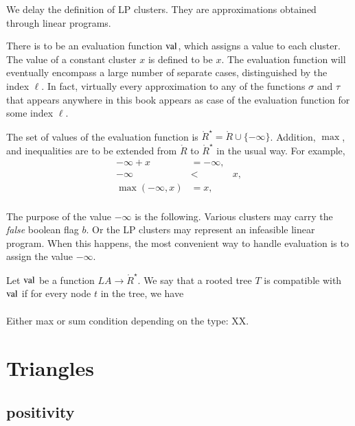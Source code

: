 We delay the definition of LP clusters.  They are approximations
obtained through linear programs.



There is to be an evaluation function ${\operatorname{val}}$, which assigns a value
to each cluster.  The value of a constant cluster $x$ is defined to be $x$.
The evaluation function will eventually encompass a large number of
separate cases, distinguished by the index $\ell$.  
In fact, virtually every approximation
to any of the functions $\sigma$ and $\tau$ that appears anywhere
in this book appears as case of the evaluation function for some index
$\ell$.

The set of values of the evaluation function is 
$\ring{R}^\star = \ring{R}\cup\{-\infty\}$.
Addition, $\max$, and inequalities are to be extended from
$\ring{R}$ to $\ring{R}^\star$ in the usual way.  For example,
  $$
  \begin{array}{lll}
    -\infty + x &= -\infty,\\
    -\infty &< & x,\\
    \max(-\infty,x) &= x,\\
    \end{array}
  $$

The purpose of the value $-\infty$ is the following.  Various
clusters may carry the {\it false} boolean flag $b$.  Or the
LP clusters may represent an infeasible linear program.  When
this happens, the most convenient way to handle evaluation is
to assign the value $-\infty$.

\begin{definition}
Let ${\operatorname{val}}$
be a function $LA\to \ring{R}^\star$.  We say that
a rooted tree $T$ is compatible with ${\operatorname{val}}$ if for every
node $t$ in the tree, we have
   $$
   \begin{array}{lll}
     \end{array}
   $$
\end{definition}

Either max or sum condition depending on the type: XX.

\section{Triangles}


\subsection{positivity}%
    \label{sec:pos}

